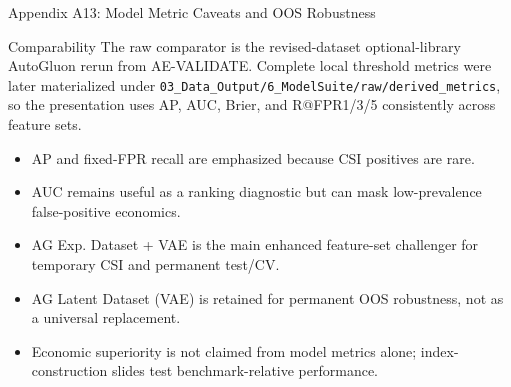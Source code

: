 \documentclass[10pt]{beamer}\usepackage[]{graphicx}\usepackage[table]{xcolor}
\begin{document}
\begin{frame}{Appendix A13: Model Metric Caveats and OOS Robustness}
\scriptsize
\begin{block}{Comparability}
\scriptsize
The raw comparator is the revised-dataset optional-library AutoGluon rerun from AE-VALIDATE. Complete local threshold metrics were later materialized under \texttt{03\_Data\_Output/6\_ModelSuite/raw/derived\_metrics}, so the presentation uses AP, AUC, Brier, and R@FPR1/3/5 consistently across feature sets.
\end{block}
\vspace{0.15em}
\begin{itemize}
  \item AP and fixed-FPR recall are emphasized because CSI positives are rare.
  \item AUC remains useful as a ranking diagnostic but can mask low-prevalence false-positive economics.
  \item AG Exp. Dataset + VAE is the main enhanced feature-set challenger for temporary CSI and permanent test/CV.
  \item AG Latent Dataset (VAE) is retained for permanent OOS robustness, not as a universal replacement.
  \item Economic superiority is not claimed from model metrics alone; index-construction slides test benchmark-relative performance.
\end{itemize}
\end{frame}
\end{document}
